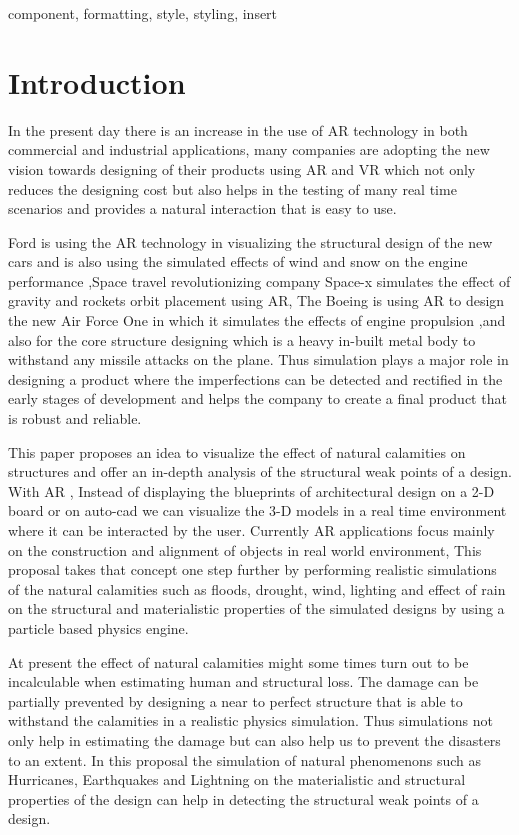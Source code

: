 \documentclass[conference]{IEEEtran}
\begin{document}
\begin{IEEEkeywords}
component, formatting, style, styling, insert
\end{IEEEkeywords}

\section{Introduction}
In the present day there is an increase in the use of AR technology in both commercial and industrial applications, many companies are adopting the new vision towards designing of their products using AR and VR which not only reduces the designing cost but also helps in the testing of many real time scenarios and provides a natural interaction that is easy to use.

Ford is using the AR technology in visualizing the structural design of the new cars and is also using the simulated effects of wind and snow on 
the engine performance ,Space travel revolutionizing company Space-x simulates the effect of gravity and rockets orbit placement using AR, 
The Boeing is using AR to design the new Air Force One in which it simulates the effects of engine propulsion ,and also for the core structure designing which is a heavy in-built metal body to withstand any missile attacks on the plane. Thus simulation plays a major role in designing a product where the imperfections can be detected and rectified in the early stages of development and helps the company to create a final product that is robust and reliable.

This paper proposes an idea to visualize the effect of natural calamities on structures and offer an in-depth analysis of the structural weak points of a design. With AR , Instead of displaying the blueprints of architectural design on a 2-D board or on auto-cad we can visualize the 3-D models in a real time environment where it can be interacted by the user. Currently AR applications focus mainly on the construction and alignment of objects in real world environment, This proposal takes that concept one step further by performing realistic simulations of the natural calamities such as floods,  drought, wind, lighting and effect of rain on the structural and materialistic properties of the simulated designs by using a particle based physics engine. 

At present the effect of natural calamities might some times turn out to be incalculable when estimating human and structural loss. The damage can be partially prevented by designing a near to perfect structure that is able to withstand the calamities in a realistic physics simulation. Thus simulations not only help in estimating the damage but can also help us to prevent the disasters to an extent. In this proposal the simulation of natural phenomenons such as Hurricanes, Earthquakes and Lightning on the materialistic and structural properties of the design can help in detecting the structural weak points of a design.
\end{document}
